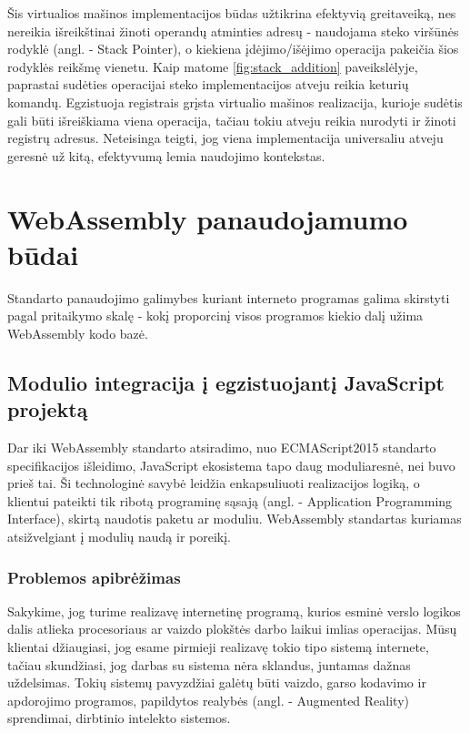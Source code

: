 \documentclass{VUMIFPSkursinis}
\begin{document}
Šis virtualios mašinos implementacijos būdas užtikrina efektyvią greitaveiką, nes nereikia išreikštinai žinoti operandų atminties adresų - naudojama steko viršūnės rodyklė (angl. - Stack Pointer), o kiekiena įdėjimo/išėjimo operacija pakeičia šios rodyklės reikšmę vienetu.
Kaip matome \ref{fig:stack_addition} paveikslėlyje, paprastai sudėties operacijai steko implementacijos atveju reikia keturių komandų. Egzistuoja registrais grįsta virtualio mašinos realizacija, kurioje sudėtis gali būti išreiškiama viena operacija, tačiau tokiu atveju reikia nurodyti ir žinoti registrų adresus. Neteisinga teigti, jog viena implementacija universaliu atveju geresnė už kitą, efektyvumą lemia naudojimo kontekstas.

\section{WebAssembly panaudojamumo būdai}
Standarto panaudojimo galimybes kuriant interneto programas galima skirstyti pagal pritaikymo skalę - kokį proporcinį visos programos kiekio dalį užima WebAssembly kodo bazė.

\subsection{Modulio integracija į egzistuojantį JavaScript projektą}
Dar iki WebAssembly standarto atsiradimo, nuo ECMAScript2015 standarto specifikacijos išleidimo, JavaScript ekosistema tapo daug moduliaresnė, nei buvo prieš tai. Ši technologinė savybė leidžia enkapsuliuoti realizacijos logiką, o klientui pateikti tik ribotą programinę sąsają (angl. - Application Programming Interface), skirtą naudotis paketu ar moduliu. WebAssembly standartas kuriamas atsižvelgiant į modulių naudą ir poreikį.

\subsubsection{Problemos apibrėžimas}
Sakykime, jog turime realizavę internetinę programą, kurios esminė verslo logikos dalis atlieka procesoriaus ar vaizdo plokštės darbo laikui imlias operacijas. Mūsų klientai džiaugiasi, jog esame pirmieji realizavę tokio tipo sistemą internete, tačiau skundžiasi, jog darbas su sistema nėra sklandus, juntamas dažnas uždelsimas. Tokių sistemų pavyzdžiai galėtų būti vaizdo, garso kodavimo ir apdorojimo programos, papildytos realybės (angl. - Augmented Reality) sprendimai, dirbtinio intelekto sistemos. 
\end{document}
